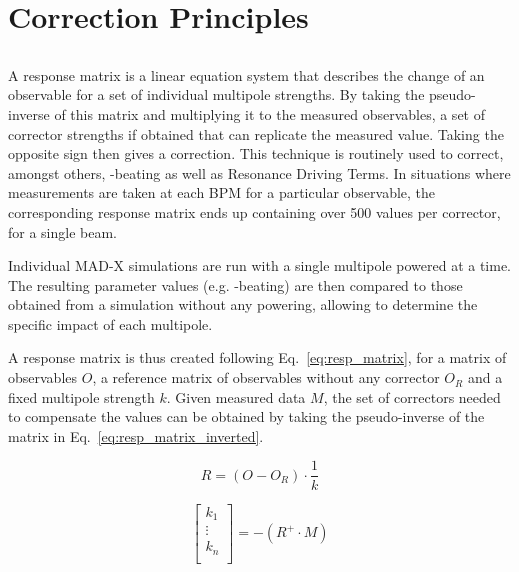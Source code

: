 \section{Correction Principles}


\subsection{}

A response matrix is a linear equation system that describes the change of an observable for a set
of individual multipole strengths. By taking the pseudo-inverse of this matrix and multiplying it to
the measured observables, a set of corrector strengths if obtained that can replicate the measured
value. Taking the opposite sign then gives a correction.  This technique is routinely used to
correct, amongst others, \beta-beating as well as Resonance Driving Terms. In situations where
measurements are taken at each BPM for a particular observable, the corresponding response matrix
ends up containing over 500 values per corrector, for a single beam.

Individual MAD-X simulations are run with a single multipole powered at a time. The resulting
parameter values (e.g. \beta-beating) are then compared to those obtained from a simulation without
any powering, allowing to determine the specific impact of each multipole.

A response matrix is thus created following Eq.~\eqref{eq:resp_matrix}, for a matrix of observables
$O$, a reference matrix of observables without any corrector $O_R$ and a fixed multipole strength
$k$. Given measured data $M$, the set of correctors needed to compensate the values can be obtained
by taking the pseudo-inverse of the matrix in Eq.~\eqref{eq:resp_matrix_inverted}.

\begin{equation}
  R = \left(O - O_R \right) \cdot \frac{1}{k}
  \label{eq:resp_matrix}
\end{equation}

\begin{equation}
  \begin{bmatrix}
    k_1 \\
    \vdots \\
    k_n \\
  \end{bmatrix}
  = -(R^{+} \cdot M)
  \label{eq:resp_matrix_inverted}
\end{equation}
 
